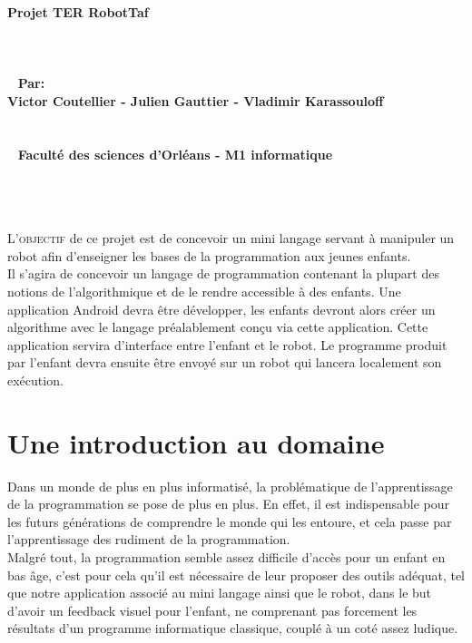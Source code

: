 \documentclass[a4paper]{article}
\begin{document}
\begin{center}
{\Huge \textbf{Projet TER RobotTaf}}
\\~
\\~
\\~
\\~
{\Large \textbf{Par:}}\\
\large{\textbf{Victor Coutellier - Julien Gauttier - Vladimir Karassouloff}}
\\~
\\~
\\~
\large{\textbf{Faculté des sciences d’Orléans -  M1 informatique}}
\\~
\\~
\\~
\end{center}

\tableofcontents
\newpage

\lettrine{L}{'objectif} de ce projet est de concevoir un mini langage servant à manipuler un robot afin d’enseigner les bases de la programmation aux jeunes enfants.
\\
Il s’agira de concevoir un langage de programmation contenant la plupart des notions de l’algorithmique et de le rendre accessible à des enfants. Une application Android devra être développer, les enfants devront alors créer un algorithme avec le langage préalablement conçu via cette application. Cette application servira d’interface entre l’enfant et le robot. Le programme produit par l’enfant devra ensuite être envoyé sur un robot qui lancera localement son exécution.

\section{Une introduction au domaine}

Dans un monde de plus en plus informatisé, la problématique de l’apprentissage de la programmation se pose de plus en plus. En effet, il est indispensable  pour les futurs générations de comprendre le monde qui les entoure, et cela passe par l’apprentissage des rudiment de la programmation. \\
Malgré tout, la programmation semble assez difficile d’accès pour un enfant en bas âge, c’est pour cela qu’il est nécessaire de leur proposer des outils adéquat, tel que notre application associé au mini langage ainsi que le robot, dans le but d’avoir un feedback visuel pour l’enfant, ne comprenant pas forcement les résultats d’un programme informatique classique, couplé à un coté assez ludique.
\end{document}
